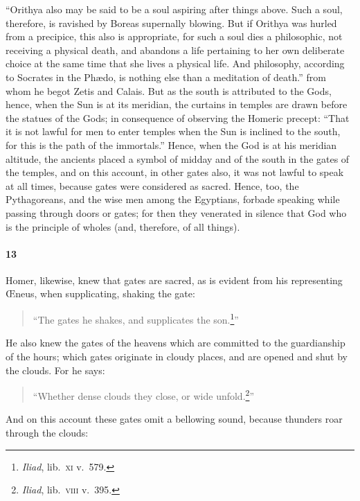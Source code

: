 \documentclass[12pt]{article}
\begin{document}
{``Orithya also may be said to be a soul aspiring after things above. Such a
soul, therefore, is ravished by Boreas supernally blowing. But if Orithya was
hurled from a precipice, this also is appropriate, for such a soul dies a
philosophic, not receiving a physical death, and abandons a life pertaining to
her own deliberate choice at the same time that she lives a physical life. And
philosophy, according to Socrates in the Ph{\ae}do, is nothing else than a
meditation of death.''} from whom he begot Zetis and Calais. But as the south
is attributed to the Gods, hence, when the Sun is at its meridian, the curtains
in temples are drawn before the statues of the Gods; in consequence of
observing the Homeric precept: ``That it is not lawful for men to enter temples
when the Sun is inclined to the south, for this is the path of the immortals.''
Hence, when the God is at his meridian altitude, the ancients placed a symbol
of midday and of the south in the gates of the temples, and on this account, in
other gates also, it was not lawful to speak at all times, because gates were
considered as sacred. Hence, too, the Pythagoreans, and the wise men among the
Egyptians, forbade speaking while passing through doors or gates; for then they
venerated in silence that God who is the principle of wholes (and, therefore,
of all things).


\paragraph{13} Homer, likewise, knew that gates are sacred, as is evident from
his representing {\OE}neus, when supplicating, shaking the gate:

\begin{verse}
``The gates he shakes, and supplicates the son.\footnote{\textit{Iliad}, lib.~\textsc{xi} v.~579.}''
\end{verse}

\noindent He also knew the gates of the heavens which are committed to the
guardianship of the hours; which gates originate in cloudy places, and are
opened and shut by the clouds. For he says:

\begin{verse}
``Whether dense clouds they close, or wide unfold.\footnote{\textit{Iliad}, lib.~\textsc{viii} v.~395.}''
\end{verse}

\noindent And on this account these gates omit a bellowing sound, because thunders roar through the clouds:
\end{document}
